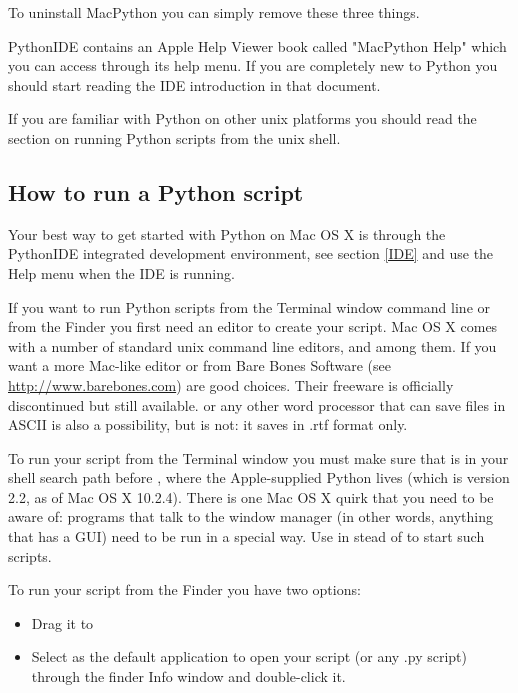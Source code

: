 To uninstall MacPython you can simply remove these three things.

PythonIDE contains an Apple Help Viewer book called "MacPython Help"
which you can access through its help menu. If you are completely new to
Python you should start reading the IDE introduction in that document.

If you are familiar with Python on other unix platforms you should read the
section on running Python scripts from the unix shell.

\subsection{How to run a Python script}

Your best way to get started with Python on Mac OS X is through the PythonIDE
integrated development environment, see section \ref{IDE} and use the Help
menu when the IDE is running.

If you want to run Python scripts from the Terminal window command line
or from the Finder you first need an editor to create your script.
Mac OS X comes with a number of standard unix command line editors,
 and  among them. If you want a more Mac-like
editor  or  from Bare Bones Software
(see \url{http://www.barebones.com}) are good choices. Their freeware
 is officially discontinued but still available.
 or any other word processor that can save files
in ASCII is also a possibility, but  is not: it saves in .rtf
format only.

To run your script from the Terminal window you must make sure that
 is in your shell search path before ,
where the Apple-supplied Python lives (which is version 2.2, as of Mac OS X
10.2.4). There is one Mac OS X quirk that you need to be aware of: programs
that talk to the window manager (in other words, anything that has a GUI)
need to be run in a special way. Use  in stead of 
to start such scripts.

To run your script from the Finder you have two options:
\begin{itemize}
    \item Drag it to 
    \item Select  as the default application
    to open your script (or any .py script) through the finder Info window
    and double-click it.
\end{itemize}

